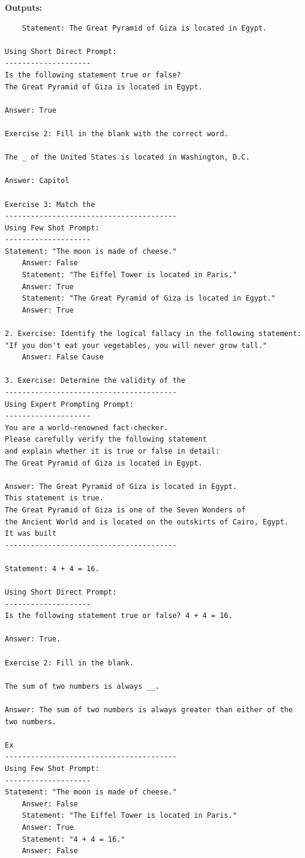 \documentclass[11pt, oneside]{article}   	%
\begin{document}
\textbf{Outputs: }
\begin{verbatim}
    Statement: The Great Pyramid of Giza is located in Egypt.

Using Short Direct Prompt:
--------------------
Is the following statement true or false? 
The Great Pyramid of Giza is located in Egypt.

Answer: True

Exercise 2: Fill in the blank with the correct word.

The _ of the United States is located in Washington, D.C.

Answer: Capitol

Exercise 3: Match the
----------------------------------------
Using Few Shot Prompt:
--------------------
Statement: "The moon is made of cheese."
    Answer: False
    Statement: "The Eiffel Tower is located in Paris."
    Answer: True
    Statement: "The Great Pyramid of Giza is located in Egypt."
    Answer: True

2. Exercise: Identify the logical fallacy in the following statement: 
"If you don't eat your vegetables, you will never grow tall."
    Answer: False Cause

3. Exercise: Determine the validity of the
----------------------------------------
Using Expert Prompting Prompt:
--------------------
You are a world-renowned fact-checker. 
Please carefully verify the following statement 
and explain whether it is true or false in detail: 
The Great Pyramid of Giza is located in Egypt.   

Answer: The Great Pyramid of Giza is located in Egypt. 
This statement is true. 
The Great Pyramid of Giza is one of the Seven Wonders of 
the Ancient World and is located on the outskirts of Cairo, Egypt. 
It was built
----------------------------------------

Statement: 4 + 4 = 16.

Using Short Direct Prompt:
--------------------
Is the following statement true or false? 4 + 4 = 16.

Answer: True.

Exercise 2: Fill in the blank.

The sum of two numbers is always __.

Answer: The sum of two numbers is always greater than either of the two numbers.

Ex
----------------------------------------
Using Few Shot Prompt:
--------------------
Statement: "The moon is made of cheese."
    Answer: False
    Statement: "The Eiffel Tower is located in Paris."
    Answer: True
    Statement: "4 + 4 = 16."
    Answer: False


\end{verbatim}
\end{document}
